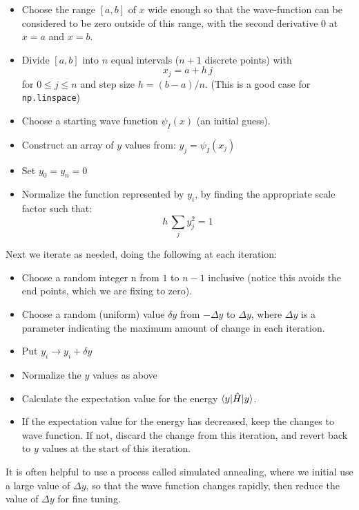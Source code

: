 \documentclass[12pt]{article}
\begin{document}
\begin{itemize}
\item Choose the range $[a,b]$ of $x$ wide enough so that the wave-function can 
be considered to be zero outside of this range, with the second derivative 0 at $x=a$ and $x=b$.
\item Divide $[a,b]$ into $n$ equal intervals ($n+1$ discrete points) with
$$x_j = a + h\,j$$ for $0 \leq j \leq n$ and step size $h = (b-a)/n$.  (This is a good case for {\tt np.linspace})
\item Choose a starting wave function $\psi_I(x)$ (an initial guess).
\item Construct an array of $y$ values from:
  $y_j = \psi_I(x_j)$
\item Set $y_0 = y_{n} = 0$
\item Normalize the function represented by $y_i$, by finding the appropriate scale factor such that:
$$h \, \sum_j y_j^2 = 1$$
\end{itemize}
Next we iterate as needed, doing the following at each iteration:
\begin{itemize}
\item Choose a random integer n from $1$ to $n-1$ inclusive (notice this avoids the end points, which we are fixing to zero).
\item Choose a random (uniform) value $\delta y$ from $-\Delta y$ to $\Delta y$, where $\Delta y$ is a parameter indicating the maximum amount of change in each iteration.
\item Put $y_i \to y_i + \delta y$
\item Normalize the $y$ values as above
\item Calculate the expectation value for the energy $\braket{y|\hat{H}|y}$.
\item If the expectation value for the energy has decreased, keep the changes to wave function.  If not, discard the change from this iteration, and revert back to $y$ values at the start of this iteration.
\end{itemize}  
It is often helpful to use a process called simulated annealing, where we initial use a large value of $\Delta y$, so that the wave function changes rapidly, then reduce the value of $\Delta y$ for fine tuning.

\end{document}
